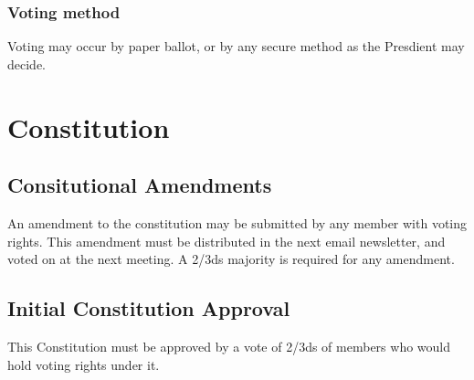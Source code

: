 \documentclass{article}
\begin{document}
\subsubsection{Voting method}
Voting may occur by paper ballot, or by any secure method as the Presdient may decide.
\section{Constitution}
\subsection{Consitutional Amendments}
An amendment to the constitution may be submitted by any member with voting rights.  This amendment must be distributed in the next email newsletter, and voted on at the next meeting.  A 2/3ds majority is required for any amendment.
\subsection{Initial Constitution Approval}
This Constitution must be approved by a vote of 2/3ds of members who would hold voting rights under it.
\end{document}
